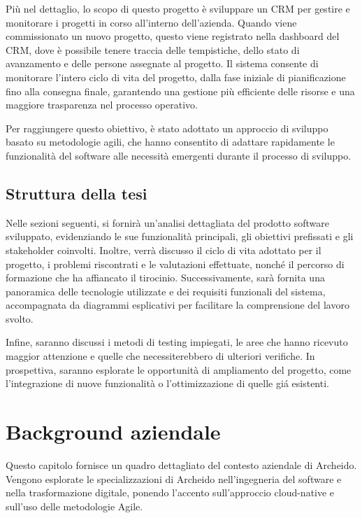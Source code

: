 \documentclass[target=bach,aauheader=,style=]{thud}
\begin{document}
\noindent  Più nel dettaglio, lo scopo di questo progetto è sviluppare un CRM per gestire e monitorare i progetti in corso all'interno dell'azienda. Quando viene commissionato un nuovo progetto, questo viene registrato nella dashboard del CRM, dove è possibile tenere traccia delle tempistiche, dello stato di avanzamento e delle persone assegnate al progetto. Il sistema consente di monitorare l'intero ciclo di vita del progetto, dalla fase iniziale di pianificazione fino alla consegna finale, garantendo una gestione più efficiente delle risorse e una maggiore trasparenza nel processo operativo.

\noindent Per raggiungere questo obiettivo, è stato adottato un approccio di sviluppo basato su metodologie agili, che hanno consentito di adattare rapidamente le funzionalità del software alle necessità emergenti durante il processo di sviluppo.


\section{Struttura della tesi}

Nelle sezioni seguenti, si fornirà un'analisi dettagliata del prodotto software sviluppato, evidenziando le sue funzionalità principali, gli obiettivi prefissati e gli stakeholder coinvolti. Inoltre, verrà discusso il ciclo di vita adottato per il progetto, i problemi riscontrati e le valutazioni effettuate, nonché il percorso di formazione che ha affiancato il tirocinio. Successivamente, sarà fornita una panoramica delle tecnologie utilizzate e dei requisiti funzionali del sistema, accompagnata da diagrammi esplicativi per facilitare la comprensione del lavoro svolto. 

\noindent Infine, saranno discussi i metodi di testing impiegati, le aree che hanno ricevuto maggior attenzione e quelle che necessiterebbero di ulteriori verifiche. In prospettiva, saranno esplorate le opportunità di ampliamento del progetto, come l'integrazione di nuove funzionalità o l'ottimizzazione di quelle giá esistenti. 

\chapter{Background aziendale}
Questo capitolo fornisce un quadro dettagliato del contesto aziendale di Archeido. Vengono esplorate le specializzazioni di Archeido nell'ingegneria del software e nella trasformazione digitale, ponendo l'accento sull'approccio cloud-native e sull'uso delle metodologie Agile.
\end{document}
